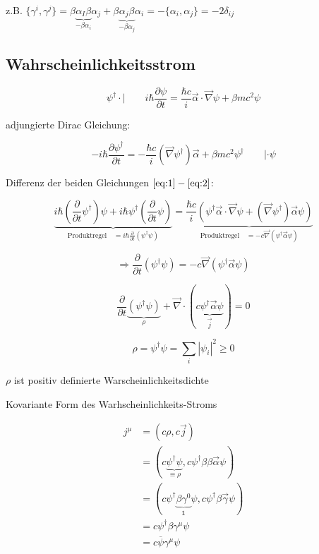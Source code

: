 z.B. \(\{\gamma^i,\gamma^j\}=\beta\underbrace{\alpha_I\beta}_{-\beta\alpha_i}\alpha_j + \beta\underbrace{\alpha_j\beta}_{-\beta\alpha_j}\alpha_i = -\{\alpha_i,\alpha_j\}=-2\delta_{ij}\)

\subsection{Wahrscheinlichkeitsstrom}

\begin{equation}
\psi^\dagger\cdot|\qquad i\hbar \frac{\partial \psi}{\partial t} = \frac{\hbar c}{i}\vec \alpha\cdot\vec\nabla\psi+\beta mc^2\psi
\label{eq:1}
\end{equation}

adjungierte Dirac Gleichung:

\begin{equation}
-i\hbar \frac{\partial \psi^\dagger}{\partial t} = -\frac{\hbar c}{i}(\vec\nabla\psi^\dagger)\vec \alpha+\beta mc^2\psi^\dagger \qquad |\cdot \psi
\label{eq:2}
\end{equation}

Differenz der beiden Gleichungen \(\ref{eq:1}-\ref{eq:2}\):

\[\underbrace{ i\hbar(\frac{\partial}{\partial t} \psi^\dagger)\psi+i\hbar\psi^\dagger (\frac{\partial}{\partial t} \psi)}_{\text{Produktregel} \quad = i\hbar\frac{\partial}{\partial t} (\psi^\dagger\psi) } =\underbrace{\frac{\hbar c}{i}(\psi^\dagger \vec \alpha\cdot\vec\nabla\psi+(\vec\nabla\psi^\dagger)\vec\alpha \psi)}_{\text{Produktregel} \quad = -c\vec\nabla(\psi^\dagger\vec\alpha\psi)} \]


\[\Rightarrow \frac{\partial}{\partial t}(\psi^\dagger\psi) = -c\vec\nabla(\psi^\dagger\vec\alpha\psi)\]

\[ \frac{\partial}{\partial t}\underbrace{(\psi^\dagger\psi) }_{\rho}+\vec\nabla\cdot(\underbrace{c\psi^\dagger\vec\alpha\psi }_{\vec j})=0 \]


\[\rho =\psi^\dagger\psi = \sum_i|\psi_i|^2\geq 0 \]

\(\rho\) ist positiv definierte Warscheinlichkeitsdichte

Kovariante Form des Warhscheinlichkeits-Stroms

\begin{align}
j^\mu &= (c\rho ,c\vec j )\\
&= (c\underbrace{\psi^\dagger\psi}_{\equiv \rho} ,c\psi^\dagger\beta\beta\vec\alpha\psi )\\
&= (c\psi^\dagger\underbrace{\beta\gamma^0}_{\mathbb 1}\psi ,c\psi^\dagger\beta\vec\gamma\psi )\\
&= c\psi^\dagger \beta\gamma^\mu \psi\\
&= c\overline \psi\gamma^\mu \psi
\end{align}

